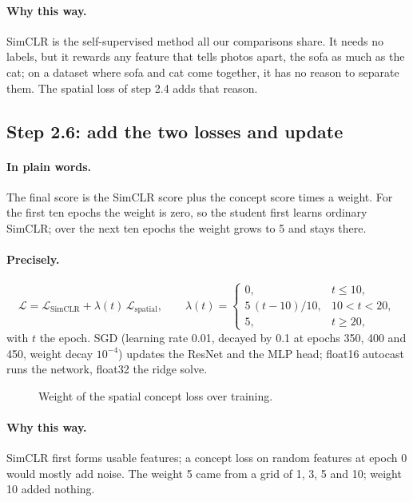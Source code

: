 \documentclass[11pt]{article}
\newcommand{\plain}{\paragraph{In plain words.}}
\newcommand{\precise}{\paragraph{Precisely.}}
\newcommand{\why}{\paragraph{Why this way.}}
\begin{document}
\why SimCLR is the self-supervised method all our comparisons share. It needs no labels, but it rewards any feature
that tells photos apart, the sofa as much as the cat; on a dataset where sofa and cat come together, it has no reason
to separate them. The spatial loss of step 2.4 adds that reason.

\subsection{Step 2.6: add the two losses and update}
\plain The final score is the SimCLR score plus the concept score times a weight. For the first ten epochs the weight
is zero, so the student first learns ordinary SimCLR; over the next ten epochs the weight grows to 5 and stays there.

\precise
\begin{equation}
\mathcal L=\mathcal L_{\text{SimCLR}}+\lambda(t)\,\mathcal L_{\text{spatial}},\qquad
\lambda(t)=\begin{cases}0,& t\le10,\\ 5\,(t-10)/10,& 10<t<20,\\ 5,& t\ge20,\end{cases}
\end{equation}
with $t$ the epoch. SGD (learning rate 0.01, decayed by 0.1 at epochs 350, 400 and 450, weight decay $10^{-4}$) updates
the ResNet and the MLP head; float16 autocast runs the network, float32 the ridge solve.

\begin{figure}[H]
\centering
{}
\caption{Weight of the spatial concept loss over training.}
\end{figure}

\why SimCLR first forms usable features; a concept loss on random features at epoch 0 would mostly add noise. The
weight 5 came from a grid of 1, 3, 5 and 10; weight 10 added nothing.

\end{document}
